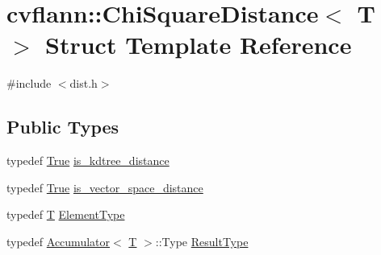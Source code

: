 \hypertarget{structcvflann_1_1ChiSquareDistance}{\section{cvflann\-:\-:Chi\-Square\-Distance$<$ T $>$ Struct Template Reference}
\label{structcvflann_1_1ChiSquareDistance}
}


{\ttfamily \#include $<$dist.\-h$>$}

\subsection*{Public Types}
\begin{DoxyCompactItemize}
\item 
typedef \hyperlink{classcvflann_1_1True}{True} \hyperlink{structcvflann_1_1ChiSquareDistance_a79abba675ec902d1e75f3e57d5af55ea}{is\-\_\-kdtree\-\_\-distance}
\item 
typedef \hyperlink{classcvflann_1_1True}{True} \hyperlink{structcvflann_1_1ChiSquareDistance_a408f961082255f1f8946efdc0de650ef}{is\-\_\-vector\-\_\-space\-\_\-distance}
\item 
typedef \hyperlink{calib3d_8hpp_a3efb9551a871ddd0463079a808916717}{T} \hyperlink{structcvflann_1_1ChiSquareDistance_a20f0256af228f8a7d290ff508a87e95a}{Element\-Type}
\item 
typedef \hyperlink{structcvflann_1_1Accumulator}{Accumulator}$<$ \hyperlink{calib3d_8hpp_a3efb9551a871ddd0463079a808916717}{T} $>$\-::Type \hyperlink{structcvflann_1_1ChiSquareDistance_a5a4ba72245b30ed720d856bbd3530478}{Result\-Type}
\end{DoxyCompactItemize}
